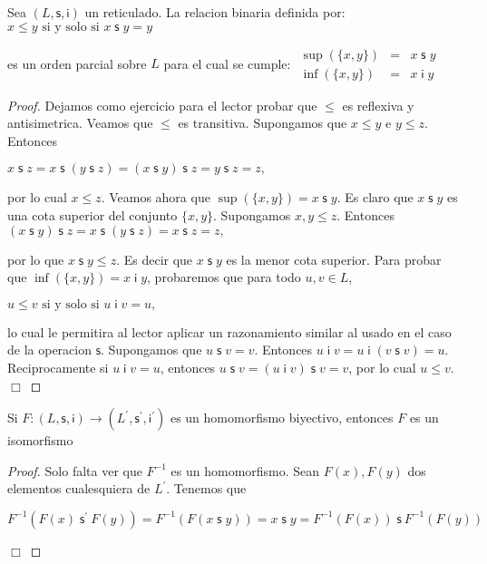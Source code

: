   \begin{theorem}
    Sea \((L,\mathsf{s},\mathsf{i})\) un reticulado. La relacion binaria definida por:
    \(\displaystyle x\leq y\text{ si y solo si }x\;\mathsf{s}\;y=y \)

    es un orden parcial sobre \(L\) para el cual se cumple:
    \(\displaystyle \begin{array}{rcl} \sup (\{x,y\}) & =& x\;\mathsf{s}\;y \\ \inf (\{x,y\}) & =& x\mathsf{\;i\;}y \end{array} \)
  \end{theorem}
  \begin{proof}
    Dejamos como ejercicio para el lector probar que \(\leq \) es reflexiva y antisimetrica. Veamos que \(\leq \) es transitiva. Supongamos que \(x\leq y\) e \( y\leq z\). Entonces

    \(\displaystyle x\;\mathsf{s\;}z=x\;\mathsf{s\;}(y\;\mathsf{s\;}z)=(x\;\mathsf{s\;}y)\; \mathsf{s\;}z=y\;\mathsf{s\;}z=z, \)

    por lo cual \(x\leq z\). Veamos ahora que \(\sup (\{x,y\})=x\;\mathsf{s\;}y\). Es claro que \(x\;\mathsf{s\;}y\) es una cota superior del conjunto \(\{x,y\}\). Supongamos \(x,y\leq z\). Entonces
    \(\displaystyle (x\;\mathsf{s\;}y)\;\mathsf{s\;}z=x\;\mathsf{s\;}(y\;\mathsf{s\;}z)=x\; \mathsf{s\;}z=z, \)

    por lo que \(x\;\mathsf{s\;}y\leq z\). Es decir que \(x\;\mathsf{s\;}y\) es la menor cota superior.
    Para probar que \(\inf (\{x,y\})=x\mathsf{\;i\;}y\), probaremos que para todo \( u,v\in L\),

    \(\displaystyle u\leq v\text{ si y solo si }u\mathsf{\;i\;}v=u, \)

    lo cual le permitira al lector aplicar un razonamiento similar al usado en el caso de la operacion \(\mathsf{s}\). Supongamos que \(u\;\mathsf{s}\;v=v\). Entonces \(u\mathsf{\;i\;}v=u\mathsf{\;i\;}(v\;\mathsf{s}\;v)=u\). Reciprocamente si \(u\mathsf{\;i\;}v=u\), entonces \(u\;\mathsf{s}\;v=(u\mathsf{ \;i\;}v)\;\mathsf{s}\;v=v\), por lo cual \(u\leq v\). \(\Box\)
  \end{proof}

  \begin{lemma}
    Si \(F:(L,\mathsf{s},\mathsf{i})\rightarrow (L^{\prime },\mathsf{s}^{\prime },\mathsf{i}^{\prime })\) es un homomorfismo biyectivo, entonces \(F\) es un isomorfismo
  \end{lemma}
  \begin{proof}
    Solo falta ver que \(F^{-1}\) es un homomorfismo. Sean \(F(x),F(y)\) dos elementos cualesquiera de \(L^{\prime }\). Tenemos que

    \(\displaystyle F^{-1}(F(x)\;\mathsf{s}^{\prime }\ F(y))=F^{-1}(F(x\mathsf{\;s\;}y))=x \mathsf{\;s\;}y=F^{-1}(F(x))\;\mathsf{s}\ F^{-1}(F(y)) \)

    \(\Box\)
  \end{proof}

